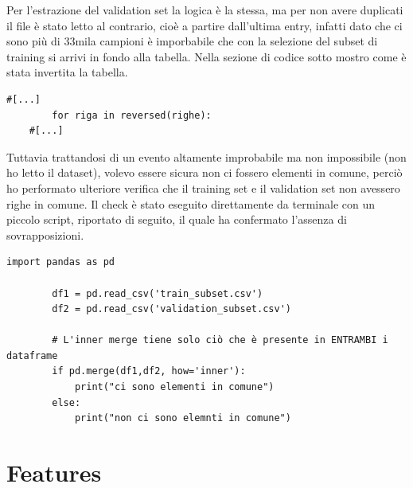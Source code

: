 \documentclass[a4paper,12pt]{report}
\begin{document}
    Per l'estrazione del validation set la logica è la stessa, ma per non avere duplicati il file è stato letto al contrario, cioè a partire dall'ultima entry, infatti dato che ci sono più di 33mila campioni è imporbabile che con la selezione del subset di training si arrivi in fondo alla tabella. Nella sezione di codice sotto mostro come è stata invertita la tabella. 
    \begin{lstlisting}[style=rulednumbered, language=python*, gobble=4]
    #[...]
        for riga in reversed(righe):
    #[...]
    \end{lstlisting}
    Tuttavia trattandosi di un evento altamente improbabile ma non impossibile (non ho letto il dataset), volevo essere sicura non ci fossero elementi in comune, perciò ho performato ulteriore verifica che il training set e il validation set non avessero righe in comune. Il check è stato eseguito direttamente da terminale con un piccolo script, riportato di seguito, il quale ha confermato l'assenza di sovrapposizioni.
    \begin{lstlisting}[style=rulednumbered, language=python*, gobble=4]
        import pandas as pd

        df1 = pd.read_csv('train_subset.csv')
        df2 = pd.read_csv('validation_subset.csv')

        # L'inner merge tiene solo ciò che è presente in ENTRAMBI i dataframe
        if pd.merge(df1,df2, how='inner'):
            print("ci sono elementi in comune")
        else:
            print("non ci sono elemnti in comune")
    \end{lstlisting}
    
    \section{Features}
    \label{sec:feratures}
\end{document}
